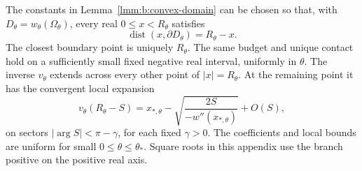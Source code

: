 \begin{prp}\label{prp:b:inverse-budget}
The constants in Lemma~\ref{lmm:b:convex-domain} can be chosen so that,
with $D_\theta=w_\theta(\Omega_\theta)$, every real
$0\leq x<R_\theta$ satisfies
\begin{equation}\label{eq:b:inverse-budget}
 \operatorname{dist}(x,\partial D_\theta)=R_\theta-x.
\end{equation}
The closest boundary point is uniquely $R_\theta$. The same budget
and unique contact hold on a sufficiently small fixed negative real
interval, uniformly in $\theta$. The inverse
$v_\theta$ extends across every other point of $|x|=R_\theta$.
At the remaining point it has the convergent local expansion
\begin{equation}\label{eq:b:morse-inverse}
 v_\theta(R_\theta-S)
 =x_{*,\theta}
       -\sqrt{\frac{2S}{-w''(x_{*,\theta})}}+O(S),
\end{equation}
on sectors $|\arg S|<\pi-\gamma$, for each fixed $\gamma>0$.
The coefficients and local bounds are uniform for small
$0\leq\theta\leq\theta_*$. Square roots in this appendix use the
branch positive on the positive real axis.
\end{prp}
